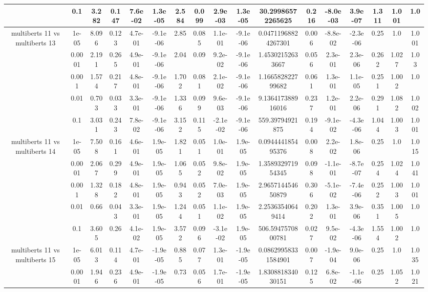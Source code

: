 \begin{tabular}{|c|c|c|c|c|c|c|c|c|c|c|c|c|c|c|c|c|}
 & 0.1 & 3.282 & 0.147 & 7.6e-02 & 1.3e-05 & 2.584 & 0.099 & 2.9e-03 & 1.3e-05 & 30.29986572265625 & 0.216 & -8.0e-03 & 3.9e-07 & 1.311 & 1.001 & 1.0 \\
\hline
\multirow{5}{*}{multiberts 11 vs multiberts 13} & 1e-05 & 8.096 & 0.123 & 4.7e-01 & -9.1e-06 & 2.85 & 0.085 & 1.1e-01 & -9.1e-06 & 0.04711968824267301 & 0.006 & -8.8e-02 & -2.3e-06 & 0.25 & 1.0 & 1.001 \\
 & 0.0001 & 2.191 & 0.265 & 4.9e-01 & -9.1e-06 & 2.04 & 0.09 & 9.2e-02 & -9.1e-06 & 1.45302152633667 & 0.056 & 2.3e-01 & 2.3e-06 & 0.262 & 1.027 & 1.03 \\
 & 0.001 & 1.574 & 0.217 & 4.8e-01 & -9.1e-06 & 1.702 & 0.081 & 2.1e-02 & -9.1e-06 & 1.166582822799682 & 0.061 & 1.3e-01 & 1.1e-05 & 0.251 & 1.002 & 1.0 \\
 & 0.01 & 0.703 & 0.033 & 3.3e-01 & -9.1e-06 & 1.336 & 0.099 & 9.6e-03 & -9.1e-06 & 9.136417388916016 & 0.237 & 1.2e-01 & 2.2e-06 & 0.291 & 1.082 & 1.002 \\
 & 0.1 & 3.031 & 0.243 & 7.8e-02 & -9.1e-06 & 3.152 & 0.115 & -2.1e-02 & -9.1e-06 & 559.39794921875 & 0.194 & -9.1e-02 & -4.3e-06 & 1.044 & 1.003 & 1.001 \\
\hline
\multirow{5}{*}{multiberts 11 vs multiberts 14} & 1e-05 & 7.508 & 0.161 & 4.6e-01 & 1.9e-05 & 1.821 & 0.051 & 1.0e-01 & 1.9e-05 & 0.094444185495376 & 0.008 & 2.2e-02 & 1.8e-06 & 0.25 & 1.0 & 1.015 \\
 & 0.0001 & 2.067 & 0.299 & 4.9e-01 & 1.9e-05 & 1.065 & 0.052 & 9.8e-02 & 1.9e-05 & 1.358932971954345 & 0.098 & -1.1e-01 & -8.7e-07 & 0.254 & 1.024 & 1.041 \\
 & 0.001 & 1.328 & 0.182 & 4.8e-01 & 1.9e-05 & 0.943 & 0.052 & 7.0e-03 & 1.9e-05 & 2.965714454650879 & 0.306 & -5.1e-02 & -7.4e-06 & 0.252 & 1.003 & 1.001 \\
 & 0.01 & 0.66 & 0.043 & 3.3e-01 & 1.9e-05 & 1.244 & 0.051 & 1.1e-02 & 1.9e-05 & 2.25363540649414 & 0.202 & 1.3e-01 & 3.9e-06 & 0.351 & 1.005 & 1.0 \\
 & 0.1 & 3.605 & 0.26 & 4.1e-02 & 1.9e-05 & 3.572 & 0.096 & -3.1e-02 & 1.9e-05 & 506.5947570800781 & 0.027 & 9.5e-02 & -4.3e-06 & 1.554 & 1.002 & 1.0 \\
\hline
\multirow{5}{*}{multiberts 11 vs multiberts 15} & 1e-05 & 6.013 & 0.114 & 4.7e-01 & -1.9e-05 & 0.885 & 0.077 & 1.3e-01 & -1.9e-05 & 0.08629958331584901 & 0.007 & -1.9e-04 & 9.0e-06 & 0.25 & 1.0 & 1.035 \\
 & 0.0001 & 1.946 & 0.236 & 4.9e-01 & -1.9e-05 & 0.73 & 0.056 & 1.7e-01 & -1.9e-05 & 1.830881834030151 & 0.125 & 6.8e-02 & -1.1e-06 & 0.25 & 1.052 & 1.021 \\

\end{tabular}
